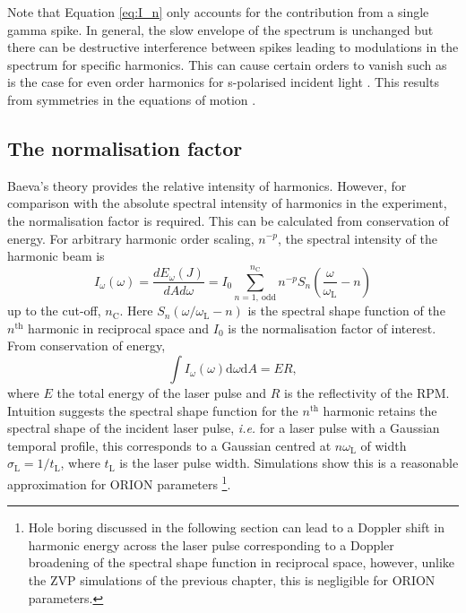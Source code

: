 Note that Equation \ref{eq:I_n} only accounts for the contribution from a single gamma spike. In general, the slow envelope of the spectrum is unchanged \cite{baevaHighHarmonicGeneration2008} but there can be destructive interference between spikes leading to modulations in the spectrum for specific harmonics. This can cause certain orders to vanish such as is the case for even order harmonics for s-polarised incident light \cite{lichtersShortpulseLaserHarmonics1996}. This results from symmetries in the equations of motion \cite{trinesLaserHarmonicGeneration2023}.


\subsection{The normalisation factor}
Baeva's theory provides the relative intensity of harmonics. However, for comparison with the absolute spectral intensity of harmonics in the experiment, the normalisation factor is required. This can be calculated from conservation of energy. For arbitrary harmonic order scaling, $n^{-p}$, the spectral intensity of the harmonic beam is
\begin{equation}
	I_\omega(\omega) = \frac{dE_\omega(J)}{dAd\omega} = I_0 \sum^{n_\mathrm{C}}_{n = 1,\ \mathrm{odd}} n^{-p} S_n\left( \frac{\omega}{\omega_\mathrm{L}}-n\right)
\end{equation}
up to the cut-off, $n_\mathrm{C}$. Here $S_n(\omega/\omega_\mathrm{L}-n)$ is the spectral shape function of the $n^\mathrm{th}$ harmonic in reciprocal space and $I_0$ is the normalisation factor of interest. From conservation of energy,
\begin{equation}
	\int I_\omega(\omega) \mathrm{d}\omega \mathrm{d} A = ER,
\end{equation}
where $E$ the total energy of the laser pulse and $R$ is the reflectivity of the \ac{RPM}. Intuition suggests the spectral shape function for the $n^\mathrm{th}$ harmonic retains the spectral shape of the incident laser pulse, \textit{i.e.} for a laser pulse with a Gaussian temporal profile, this corresponds to a Gaussian centred at $n\omega_\mathrm{L}$ of width $\sigma_\mathrm{L} = 1/t_\mathrm{L}$, where $t_\mathrm{L}$ is the laser pulse width. Simulations show this is a reasonable approximation for ORION parameters \footnote{Hole boring discussed in the following section can lead to a Doppler shift in harmonic energy across the laser pulse corresponding to a Doppler broadening of the spectral shape function in reciprocal space, however, unlike the ZVP simulations of the previous chapter, this is negligible for ORION parameters.}.

